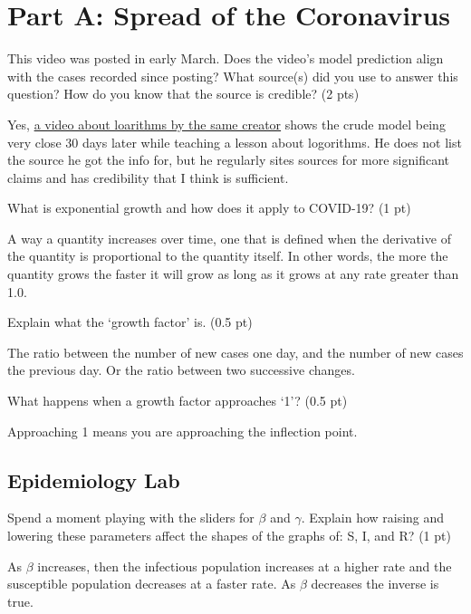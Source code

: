 \documentclass[12pt,a4paper]{article}
\begin{document}
\section*{Part A: Spread of the Coronavirus}
\begin{enumerate}[font=\bfseries, wide]
    {\color{under}\item This video was posted in early March. Does the video’s model prediction align with the cases recorded since posting? What source(s) did you use to answer this question? How do you know that the source is credible? (2 pts)}
    
    Yes, \href{https://youtu.be/cEvgcoyZvB4?t=765}{a video about loarithms by the same creator} shows the crude model being very close 30 days later while teaching a lesson about logorithms. He does not list the source he got the info for, but he regularly sites sources for more significant claims and has credibility that I think is sufficient.

    {\color{under}\item What is exponential growth and how does it apply to COVID-19? (1 pt)}
    
    A way a quantity increases over time, one that is defined when the derivative of the quantity is proportional to the quantity itself. In other words, the more the quantity grows the faster it will grow as long as it grows at any rate greater than 1.0.

    {\color{under}\item Explain what the ‘growth factor’ is. (0.5 pt)}

    The ratio between the number of new cases one day, and the number of new cases the previous day. Or the ratio between two successive changes.

    {\color{under}\item What happens when a growth factor approaches ‘1’? (0.5 pt)}

    Approaching 1 means you are approaching the inflection point.
\subsection*{Epidemiology Lab}

    {\color{under}\item Spend a moment playing with the sliders for $\beta$ and $\gamma$. Explain how raising and lowering these parameters affect the shapes of the graphs of: S, I, and R?  (1 pt)}
    
    As $\beta$ increases, then the infectious population increases at a higher rate and the susceptible population decreases at a faster rate. As $\beta$ decreases the inverse is true.


\end{enumerate}
\end{document}
